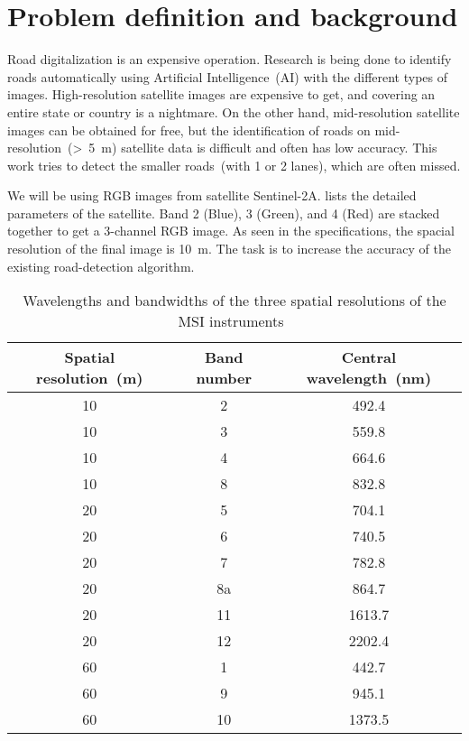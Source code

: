 \chapter{Problem definition and background}\label{chapt:problem}
Road digitalization is an expensive operation. Research is being done to identify roads automatically using Artificial Intelligence~(AI) with the different types of images. High-resolution satellite images are expensive to get, and covering an entire state or country is a nightmare. On the other hand, mid-resolution satellite images can be obtained for free, but the identification of roads on mid-resolution~(>~5~m) satellite data is difficult and often has low accuracy. This work tries to detect the smaller roads~(with 1 or 2 lanes), which are often missed.

We will be using RGB images from satellite Sentinel-2A.  lists the detailed parameters of the satellite. Band 2 (Blue), 3 (Green), and 4 (Red) are stacked together to get a 3-channel RGB image. As seen in the specifications, the spacial resolution of the final image is 10~m. The task is to increase the accuracy of the existing road-detection algorithm.

\begin{table}[h!]
  \centering
  \begin{tabular}{ |c|c|c| }
    \hline
    Spatial resolution~(m) & Band number & Central wavelength~(nm) \\
    \hline
    10&2&492.4 \\
    10&3&559.8 \\
    10&4&664.6 \\
    10&8&832.8 \\
    20&5&704.1 \\
    20&6&740.5 \\
    20&7&782.8 \\
    20&8a&864.7 \\
    20&11&1613.7 \\
    20&12&2202.4 \\
    60&1&442.7 \\
    60&9&945.1 \\
    60&10&1373.5 \\
    \hline
  \end{tabular}
  \caption[Wavelengths and bandwidths of the three spatial resolutions of the MSI instruments]{Wavelengths and bandwidths of the three spatial resolutions of the MSI instruments~\cite{sentinelSpecifications}}
  \label{tab:sentinel-resolution}
\end{table}


